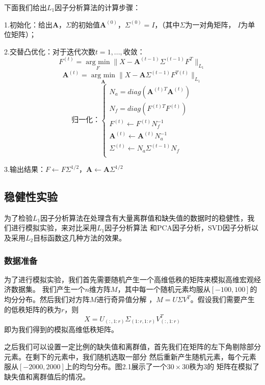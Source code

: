 下面我们给出$L_1$因子分析算法的计算步骤：

1.初始化：给出$\bm{A}$，$\Sigma$的初始值$\bm{A}^{(0)}$，$\Sigma^{(0)} = I$，（其中$\Sigma$为一对角矩阵，
$I$为单位矩阵）；

2.交替凸优化：对于迭代次数$t = 1, ..., $收敛：
$$F^{(t)} = \underset{F}{\operatorname{arg\ min}} \|X - \bm{A}^{(t-1)}\Sigma^{(t-1)}F^{T}\|_{L_1}$$
$$\bm{A}^{(t)} = \underset{\bm{A}}{\operatorname{arg\ min}} \|X - \bm{A}\Sigma^{(t-1)}F^{T(t)} \|_{L_1}$$
\begin{equation*}
    \text{归一化：}\left\{
                 \begin{array}{clr}
                 N_a = diag(\bm{A}^{(t)T}\bm{A}^{(t)})\\
                 N_f = diag(F^{(t)T}F^{(t)})\\
                 F^{(t)} \leftarrow F^{(t)}N_f^{-1}\\
                 \bm{A}^{(t)}\leftarrow \bm{A}^{(t)}N_a^{-1}\\
                 \Sigma^{(t)} \leftarrow N_a\Sigma^{(t-1)}N_f\\
                 \end{array}
    \right.
\end{equation*}

3.输出结果：$F \leftarrow F\Sigma^{1/2}$，$\bm{A} \leftarrow \bm{A}\Sigma^{1/2}$

\subsection{稳健性实验}
为了检验$L_1$因子分析算法在处理含有大量离群值和缺失值的数据时的稳健性，我们进行模拟实验，来对比采用$L_1$因子分析算法
和PCA因子分析，SVD因子分析以及采用$L_2$目标函数这几种方法的效果。

\subsubsection{数据准备}
为了进行模拟实验，我们首先需要随机产生一个高维低秩的矩阵来模拟高维宏观经济数据集。
我们产生一个$n$维方阵$M$，其中每一个随机元素均服从$[-100, 100]$的均分分布。然后我们对方阵$M$进行奇异值分解
，$M = U\Sigma V^{T}$。假设我们需要产生的低秩矩阵的秩为$r$，则$$X = U_{(:,1:r)}\Sigma_{(1:r,1:r)}V^T_{(:,1:r)}$$
即为我们得到的模拟高维低秩矩阵。

之后我们可以设置一定比例的缺失值和离群值，首先我们在矩阵的左下角剔除部分元素。在剩下的元素中，我们随机选取一部分
然后重新产生随机元素，每个元素服从$[-2000,2000]$上的均匀分布。图2.1展示了一个$30\times30$秩为3的
矩阵在模拟了缺失值和离群值后的情况。


